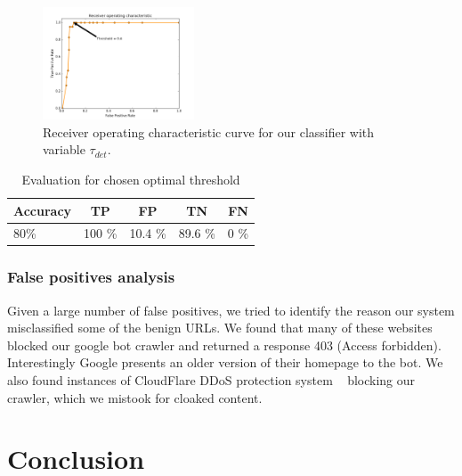 \documentclass[letterpaper,twocolumn,10pt]{article}
\begin{document}
\begin{figure}[ht]
  \centering
  \includegraphics[width=0.4\textwidth]{./proj-roc.png}
  \caption{Receiver operating characteristic curve for our classifier with variable $\tau_{det}$.}
  \label{fig:roc}
\end{figure}



\begin{table}
\begin{center}
\begin{tabular}{|lcccc|}
\hline
{\bf Accuracy} & {\bf TP} & {\bf FP}  & {\bf TN} & {\bf FN}\\
\hline
80\% & 100 \% & 10.4 \% &  89.6 \% & 0 \%\\
\hline
\end{tabular}
\end{center}
\caption{Evaluation for chosen optimal threshold}\label{tab:eval}
\end{table}

\subsubsection{False positives analysis}
Given a large number of false positives, we tried to identify the reason our system misclassified some of the benign URLs. We found that many of these websites blocked our google bot crawler and returned a response 403 (Access forbidden). Interestingly Google presents an older version of their homepage to the bot. We also found instances of CloudFlare DDoS protection system ~\cite{cloudflare} blocking our crawler, which we mistook for cloaked content.

\section{Conclusion}

{
  \small
  
  
}
\end{document}
